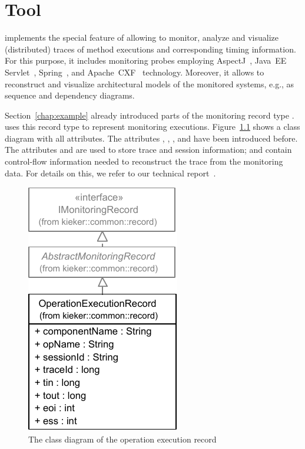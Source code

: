 % 

\chapter{\KiekerTraceAnalysis{} Tool}\label{chap:aspectJ}

\KiekerTraceAnalysis{} implements the special feature of \Kieker{} allowing to %
monitor, analyze and visualize (distributed) traces of method executions and %
corresponding timing information. For this purpose, it includes monitoring probes employing %
AspectJ~\cite{AspectJ-WebSite}, Java~EE Servlet~\cite{JavaServletTechnology-WebSite}, %
Spring~\cite{Spring-WebSite}, and Apache~CXF~\cite{CXF-WebSite} technology. %
Moreover, it allows to reconstruct and visualize architectural models of the %
monitored systems, e.g., as sequence and dependency diagrams. %

Section~\ref{chap:example} already introduced parts of the monitoring record %
type . \KiekerTraceAnalysis{} uses this record %
type to represent monitoring executions. Figure~\ref{fig:OperationExecutionRecordClassDiagramComplete} shows a class diagram %
with all attributes. The attributes , , %
, and  have been introduced before. %
The attributes  and  are used to store %
trace and session information;  and  contain control-flow %
information needed to reconstruct the trace from the monitoring data. %
For details on this, we refer to our technical %
report~\cite{vanHoornRohrHasselbringWallerEhlersFreyKieselhorst2009TRContinuousMonitoringOfSoftwareServicesDesignAndApplicationOfTheKiekerFramework}.

\begin{figure}[hb]\centering
\includegraphics[scale=0.8]{images/kieker_OperationExecutionRecord-complete-modified}%
\caption{The class diagram of the operation execution record}
\label{fig:OperationExecutionRecordClassDiagramComplete}
\end{figure}

